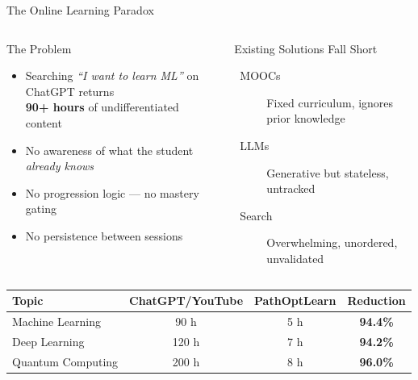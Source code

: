 \documentclass[aspectratio=169,9pt]{beamer}
\begin{document}
\begin{frame}{The Online Learning Paradox}
\begin{columns}[T]
  \begin{alertblock}{The Problem}
    \begin{itemize}
      \item Searching \textit{``I want to learn ML''} on ChatGPT returns\\
        \textbf{90+ hours} of undifferentiated content
      \item No awareness of what the student \emph{already knows}
      \item No progression logic — no mastery gating
      \item No persistence between sessions
    \end{itemize}
  \end{alertblock}

  \begin{block}{Existing Solutions Fall Short}
    \begin{description}
      \item[\faGraduationCap\ MOOCs] Fixed curriculum, ignores prior knowledge
      \item[\faRobot\ LLMs] Generative but stateless, untracked
      \item[\faBook\ Search] Overwhelming, unordered, unvalidated
    \end{description}
  \end{block}
\end{columns}

\vspace{0.4cm}
\begin{keybox}[title={Learning Efficiency Gap}]
\centering
\begin{tabular}{lccc}
  \toprule
  \textbf{Topic} & \textbf{ChatGPT/YouTube} & \textbf{PathOptLearn} & \textbf{Reduction} \\
  \midrule
  Machine Learning  & 90 h  & 5 h & \textbf{94.4\%} \\
  Deep Learning     & 120 h & 7 h & \textbf{94.2\%} \\
  Quantum Computing & 200 h & 8 h & \textbf{96.0\%} \\
  \bottomrule
\end{tabular}
\end{keybox}
\end{frame}

\end{document}
